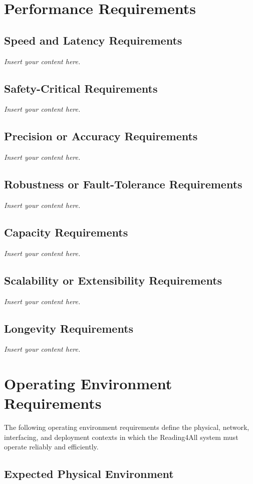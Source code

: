 \documentclass[12pt]{article}
\newcommand{\lips}{\textit{Insert your content here.}}
\begin{document}
\section{Performance Requirements}
\subsection{Speed and Latency Requirements}
\lips
\subsection{Safety-Critical Requirements}
\lips
\subsection{Precision or Accuracy Requirements}
\lips
\subsection{Robustness or Fault-Tolerance Requirements}
\lips
\subsection{Capacity Requirements}
\lips
\subsection{Scalability or Extensibility Requirements}
\lips
\subsection{Longevity Requirements}
\lips
\section{Operating Environment Requirements}

The following operating environment requirements define the physical, network, interfacing, and deployment contexts in which the Reading4All system must operate reliably and efficiently.

\subsection{Expected Physical Environment}
\end{document}
